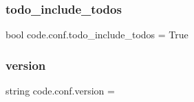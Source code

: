 \subsubsection{\texorpdfstring{todo\+\_\+include\+\_\+todos}{todo\_include\_todos}}
{\footnotesize\ttfamily bool code.\+conf.\+todo\+\_\+include\+\_\+todos = True}

\mbox{\label{namespacecode_1_1conf_ab813c501bffcefb3e16cd2d967c7cd0b}} 
\subsubsection{\texorpdfstring{version}{version}}
{\footnotesize\ttfamily string code.\+conf.\+version = \textquotesingle{}\textquotesingle{}}

